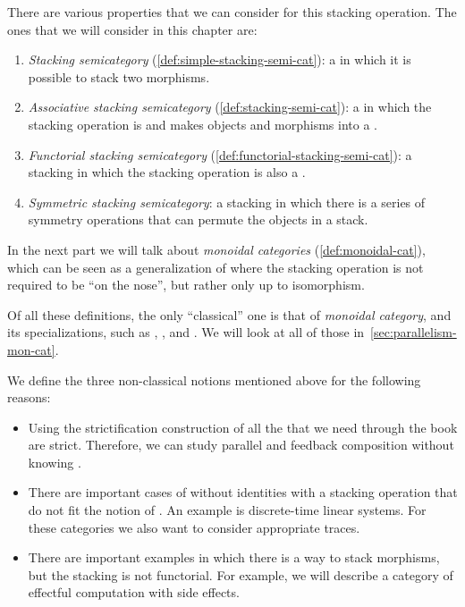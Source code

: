There are various properties that we can consider for this stacking operation.
The ones that we will consider in this chapter are:
%
\begin{enumerate}
    \item \emph{Stacking semicategory} (\cref{def:simple-stacking-semi-cat}): a  in which it is possible to stack two morphisms.
    \item \emph{Associative stacking semicategory} (\cref{def:stacking-semi-cat}): a  in which the stacking operation is  and makes objects and morphisms into a .
    \item \emph{Functorial stacking semicategory} (\cref{def:functorial-stacking-semi-cat}): a stacking  in which the stacking operation is also a .
    \item \emph{Symmetric stacking semicategory}: a stacking  in which there is a series of symmetry operations that can permute the objects in a stack.
\end{enumerate}
%
In the next part we will talk about \emph{monoidal categories} (\cref{def:monoidal-cat}), which can be seen as a generalization of    where the stacking operation is not required to be  ``on the nose'', but rather only up to isomorphism.

\begin{remark}
    Of all these definitions, the only ``classical'' one is that of \emph{monoidal category}, and its specializations, such as , , and .
    We will look at all of those in~\cref{sec:parallelism-mon-cat}.

    We define the three non-classical notions mentioned above for the following reasons:
    \begin{itemize}
        \item Using the strictification construction of \SetL all the  that we need through the book are strict.
              Therefore, we can study parallel and feedback composition without knowing .

        \item There are important cases of  without identities with a stacking operation that do not fit the notion of .
              An example is discrete-time linear systems.
              For these categories we also want to consider appropriate traces.
        \item There are important examples in which there is a way to stack morphisms, but the stacking is not functorial.
              For example, we will describe a category of effectful computation with side effects.
    \end{itemize}
\end{remark}

